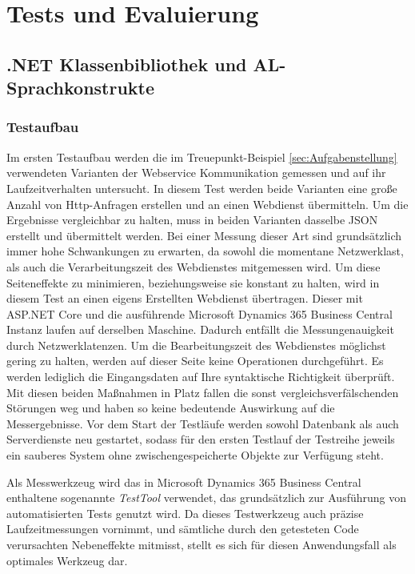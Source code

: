 \chapter{Tests und Evaluierung}
\label{cha:Tests und Evaluierung}

\section{.NET Klassenbibliothek und AL-Sprachkonstrukte}
\subsection{Testaufbau}
Im ersten Testaufbau werden die im Treuepunkt-Beispiel \ref{sec:Aufgabenstellung} verwendeten Varianten der Webservice Kommunikation gemessen und auf ihr Laufzeitverhalten untersucht. In diesem Test werden beide Varianten eine große Anzahl von Http-Anfragen erstellen und an einen Webdienst übermitteln. Um die Ergebnisse vergleichbar zu halten, muss in beiden Varianten dasselbe JSON erstellt und übermittelt werden. Bei einer Messung dieser Art sind grundsätzlich immer hohe Schwankungen zu erwarten, da sowohl die momentane Netzwerklast, als auch die Verarbeitungszeit des Webdienstes mitgemessen wird. Um diese Seiteneffekte zu minimieren, beziehungsweise sie konstant zu halten, wird in diesem Test an einen eigens Erstellten Webdienst übertragen. Dieser mit ASP.NET Core und die ausführende Microsoft Dynamics 365 Business Central Instanz laufen auf derselben Maschine. Dadurch entfällt die Messungenauigkeit durch Netzwerklatenzen. Um die Bearbeitungszeit des Webdienstes möglichst gering zu halten, werden auf dieser Seite keine Operationen durchgeführt. Es werden lediglich die Eingangsdaten auf Ihre syntaktische Richtigkeit überprüft. Mit diesen beiden Maßnahmen in Platz fallen die sonst vergleichsverfälschenden Störungen weg und haben so keine bedeutende Auswirkung auf die Messergebnisse. Vor dem Start der Testläufe werden sowohl Datenbank als auch Serverdienste neu gestartet, sodass für den ersten Testlauf der Testreihe jeweils ein sauberes System ohne zwischengespeicherte Objekte zur Verfügung steht.

Als Messwerkzeug wird das in Microsoft Dynamics 365 Business Central enthaltene sogenannte \textit{TestTool} verwendet, das grundsätzlich zur Ausführung von automatisierten Tests genutzt wird. Da dieses Testwerkzeug auch präzise Laufzeitmessungen vornimmt, und sämtliche durch den getesteten Code verursachten Nebeneffekte mitmisst, stellt es sich für diesen Anwendungsfall als optimales Werkzeug dar.
\pagebreak


